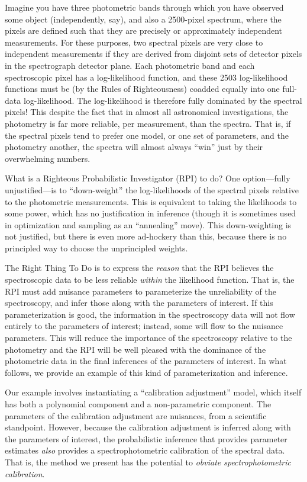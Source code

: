 \documentclass[iop,numberedappendix]{emulateapj}
\begin{document}
Imagine you have three photometric bands through which you have
observed some object (independently, say), and also a 2500-pixel
spectrum, where the pixels are defined such that they are precisely or
approximately independent measurements.
For these purposes, two spectral pixels are very close to independent
measurements if they are derived from disjoint sets of detector pixels
in the spectrograph detector plane.
Each photometric band and each spectroscopic pixel has a
log-likelihood function, and these 2503 log-likelihood functions must
be (by the Rules of Righteousness) coadded equally into one full-data
log-likelihood.
The log-likelihood is therefore fully dominated by the spectral
pixels!
This despite the fact that in almost all astronomical investigations,
the photometry is far more reliable, per measurement, than the
spectra.
That is, if the spectral pixels tend to prefer one model, or one set
of parameters, and the photometry another, the spectra will almost
always ``win'' just by their overwhelming numbers.

What is a Righteous Probabilistic Investigator (RPI) to do?
One option---fully unjustified---is to ``down-weight'' the
log-likelihoods of the spectral pixels relative to the photometric
measurements.
This is equivalent to taking the likelihoods to some power, which has
no justification in inference (though it is sometimes used in
optimization and sampling as an ``annealing'' move).
This down-weighting is not justified, but there is even more
ad-hockery than this, because there is no principled way to choose the
unprincipled weights.

The Right Thing To Do is to express the \emph{reason} that the RPI
believes the spectroscopic data to be less reliable \emph{within} the
likelihood function.
That is, the RPI must add nuisance parameters to parameterize the
unreliability of the spectroscopy, and infer those along with the
parameters of interest.
If this parameterization is good, the information in the spectroscopy
data will not flow entirely to the parameters of interest; instead,
some will flow to the nuisance parameters.
This will reduce the importance of the spectroscopy relative to the
photometry and the RPI will be well pleased with the dominance of the
photometric data in the final inferences of the parameters of
interest.
In what follows, we provide an example of this kind of
parameterization and inference.

Our example involves instantiating a ``calibration adjustment'' model,
which itself has both a polynomial component and a non-parametric
component.
The parameters of the calibration adjustment are nuisances, from a
scientific standpoint.
However, because the calibration adjustment is inferred along with the
parameters of interest, the probabilistic inference that provides
parameter estimates \emph{also} provides a spectrophotometric
calibration of the spectral data.
That is, the method we present has the potential to \emph{obviate
spectrophotometric calibration}.
\end{document}
